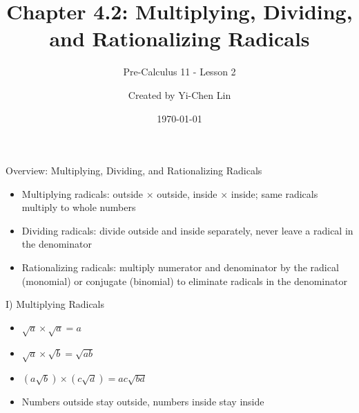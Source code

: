 \documentclass[aspectratio=169]{beamer}
\title{Chapter 4.2: Multiplying, Dividing, and Rationalizing Radicals}
\subtitle{Pre-Calculus 11 - Lesson 2}
\author{Created by Yi-Chen Lin}
\date{\today}
\begin{document}
\begin{frame}
\titlepage
\end{frame}

\begin{frame}{Overview: Multiplying, Dividing, and Rationalizing Radicals}
\begin{tcolorbox}[colback=lightgray,colframe=primary,title=Key Concepts]
\footnotesize
\begin{itemize}
  \item Multiplying radicals: outside × outside, inside × inside; same radicals multiply to whole numbers
  \item Dividing radicals: divide outside and inside separately, never leave a radical in the denominator
  \item Rationalizing radicals: multiply numerator and denominator by the radical (monomial) or conjugate (binomial) to eliminate radicals in the denominator
\end{itemize}
\end{tcolorbox}
\end{frame}

\begin{frame}{I) Multiplying Radicals}
\begin{tcolorbox}[colback=lightgray,colframe=primary,title=Rules]
\footnotesize
\begin{itemize}
  \item $\sqrt{a} \times \sqrt{a} = a$
  \item $\sqrt{a} \times \sqrt{b} = \sqrt{ab}$
  \item $(a\sqrt{b}) \times (c\sqrt{d}) = ac\sqrt{bd}$
  \item Numbers outside stay outside, numbers inside stay inside
\end{itemize}
\end{tcolorbox}
\end{frame}
\end{document}
